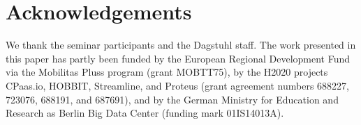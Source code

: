 \section*{Acknowledgements}
We thank the seminar participants and the Dagstuhl staff.
The work presented in this paper has partly been funded
%
by the European Regional Development Fund via the Mobilitas Pluss
program (grant MOBTT75),
%
by the H2020 projects CPaas.io, HOBBIT, Streamline, and Proteus (grant
agreement numbers 688227, 723076, 688191, and 687691),
%
and by the German Ministry for Education and Research as Berlin Big
Data Center (funding mark 01IS14013A).
